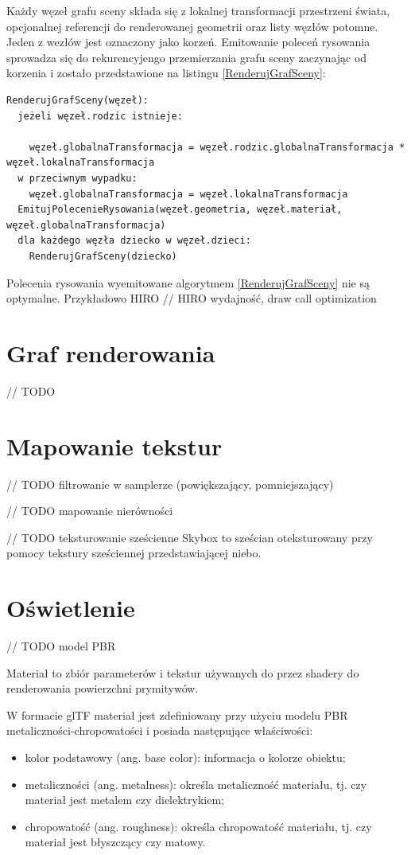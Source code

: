 Każdy węzeł grafu sceny składa się z lokalnej transformacji przestrzeni świata, opcjonalnej referencji do renderowanej geometrii oraz listy węzłów potomne. Jeden z wezłów jest oznaczony jako korzeń.
Emitowanie poleceń rysowania sprowadza się do rekurencyjengo przemierzania grafu sceny zaczynając od korzenia \cite{kosarevsky20213d} i zostało przedstawione na listingu \ref{RenderujGrafSceny}:
\lstset{language=verbatim}
\begin{lstlisting}[caption={Emitowanie poleceń rysowania na podstawie grafu sceny},captionpos=b,label={RenderujGrafSceny}]
RenderujGrafSceny(węzeł):
  jeżeli węzeł.rodzic istnieje:
    
    węzeł.globalnaTransformacja = węzeł.rodzic.globalnaTransformacja * węzeł.lokalnaTransformacja
  w przeciwnym wypadku:
    węzeł.globalnaTransformacja = węzeł.lokalnaTransformacja
  EmitujPolecenieRysowania(węzeł.geometria, węzeł.materiał, węzeł.globalnaTransformacja)
  dla każdego węzła dziecko w węzeł.dzieci:
    RenderujGrafSceny(dziecko)
\end{lstlisting}

Polecenia rysowania wyemitowane algorytmem \ref{RenderujGrafSceny} nie są optymalne.
Przykładowo HIRO
// HIRO wydajność, draw call optimization

\section{Graf renderowania}

// TODO


\section{Mapowanie tekstur}

// TODO filtrowanie w samplerze (powiększający, pomniejszający)

// TODO mapowanie nierówności

// TODO teksturowanie sześcienne
Skybox to sześcian oteksturowany przy pomocy tekstury sześciennej przedstawiającej niebo.

\section{Oświetlenie}

// TODO model PBR

Materiał to zbiór parameterów i tekstur używanych do przez shadery do renderowania powierzchni prymitywów.

W formacie glTF materiał jest zdefiniowany przy użyciu modelu PBR metaliczności-chropowatości i posiada następujące właściwości:
\begin{itemize}
	\item kolor podstawowy (ang. base color): informacja o kolorze obiektu;
	\item metaliczności (ang. metalness): określa metaliczność materiału, tj. czy materiał jest metalem czy dielektrykiem;
	\item chropowatość (ang. roughness): określa chropowatość materiału, tj. czy materiał jest błyszczący czy matowy.
\end{itemize}

